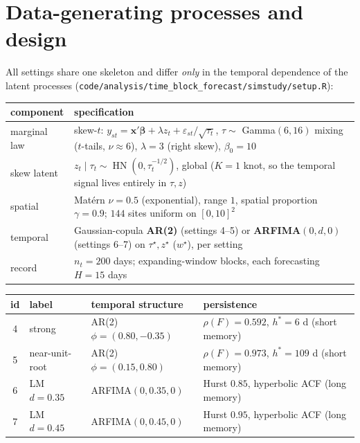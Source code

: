 \documentclass[11pt]{article}
\newcommand{\code}[1]{\texttt{#1}}
\DeclareMathOperator{\hn}{HN}
\begin{document}
\section{Data-generating processes and design}

All settings share one skeleton and differ \emph{only} in the temporal
dependence of the latent processes
(\code{code/analysis/time\_block\_forecast/simstudy/setup.R}):

\begin{center}
\small
\begin{tabular}{lp{}}
\toprule
component & specification \\
\midrule
marginal law & skew-$t$: $y_{st} = \mathbf{x}'\boldsymbol\beta + \lambda z_t
+ \varepsilon_{st}/\sqrt{\tau_t}$, $\tau \sim$ Gamma$(6, 16)$ mixing
($t$-tails, $\nu \approx 6$), $\lambda = 3$ (right skew), $\beta_0 = 10$ \\
skew latent & $z_t \mid \tau_t \sim \hn(0, \tau_t^{-1/2})$, global
($K = 1$ knot, so the temporal signal lives entirely in $\tau, z$) \\
spatial & Mat\'ern $\nu = 0.5$ (exponential), range $1$, spatial
proportion $\gamma = 0.9$; $144$ sites uniform on $[0,10]^2$ \\
temporal & Gaussian-copula \textbf{AR(2)} (settings 4--5) or
\textbf{ARFIMA$(0,d,0)$} (settings 6--7) on $\tau^\star, z^\star$ ($w^\star$),
per setting \\
record & $n_t = 200$ days; expanding-window blocks, each forecasting
$H = 15$ days \\
\bottomrule
\end{tabular}
\end{center}

\begin{center}
\small
\begin{tabular}{clll}
\toprule
id & label & temporal structure & persistence \\
\midrule
4 & strong          & AR(2) $\phi = (0.80, -0.35)$ & $\rho(F) = 0.592$,
$h^\ast = 6$ d (short memory) \\
5 & near-unit-root   & AR(2) $\phi = (0.15, 0.80)$ & $\rho(F) = 0.973$,
$h^\ast = 109$ d (short memory) \\
6 & LM $d = 0.35$    & ARFIMA$(0, 0.35, 0)$ & Hurst $0.85$, hyperbolic ACF
(long memory) \\
7 & LM $d = 0.45$    & ARFIMA$(0, 0.45, 0)$ & Hurst $0.95$, hyperbolic ACF
(long memory) \\
\bottomrule
\end{tabular}
\end{center}
\end{document}
